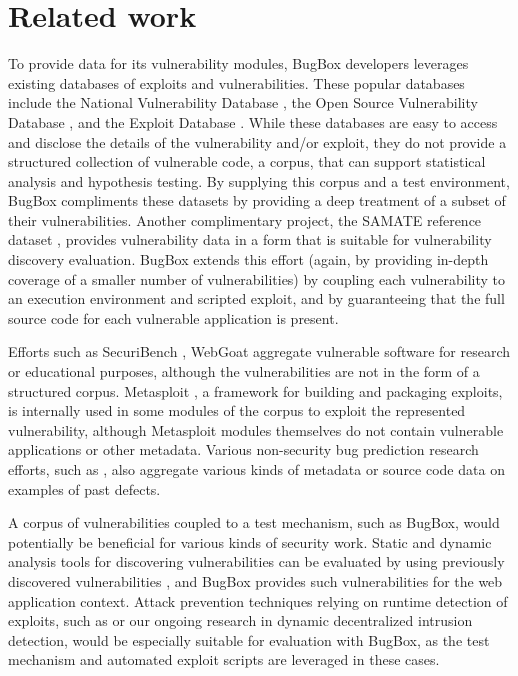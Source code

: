 \documentclass[letterpaper,twocolumn,10pt]{article}
\begin{document}
\section{Related work}
To provide data for its vulnerability modules, BugBox developers leverages existing databases of exploits and vulnerabilities. These popular databases include the National Vulnerability Database \cite{NVD}, the Open Source Vulnerability Database \cite{OSVDB}, and the Exploit Database \cite{exploitdb}. While these databases are easy to access and disclose the details of the vulnerability and/or exploit, they do not provide a structured collection of vulnerable code, a corpus, that can support statistical analysis and hypothesis testing. By supplying this corpus and a test environment, BugBox compliments these datasets by providing a deep treatment of a subset of their vulnerabilities. Another complimentary project, the SAMATE reference dataset \cite{SAMATE}, provides vulnerability data in a form that is suitable for vulnerability discovery evaluation. BugBox extends this effort (again, by providing in-depth coverage of a smaller number of vulnerabilities) by coupling each vulnerability to an execution environment and scripted exploit, and by guaranteeing that the full source code for each vulnerable application is present.

Efforts such as SecuriBench \cite{livshits2005defining}, WebGoat \cite{webgoat} aggregate vulnerable software for research or educational purposes, although the vulnerabilities are not in the form of a structured corpus. Metasploit \cite{metasploit}, a framework for building and packaging exploits, is internally used in some modules of the corpus to exploit the represented vulnerability, although Metasploit modules themselves do not contain vulnerable applications or other metadata. Various non-security bug prediction research efforts, such as \cite{defectcorpus,eclipsebugdata}, also aggregate various kinds of metadata or source code data on examples of past defects.

A corpus of vulnerabilities coupled to a test mechanism, such as BugBox, would potentially be beneficial for various kinds of security work. Static and dynamic analysis tools for discovering vulnerabilities \cite{onetechnique,antunes2009comparing} can be evaluated by using previously discovered vulnerabilities \cite{bufferoverflowbenchmark}, and BugBox provides such vulnerabilities for the web application context. Attack prevention techniques relying on runtime detection of exploits, such as \cite{commandinjection} or our ongoing research in dynamic decentralized intrusion detection, would be especially suitable for evaluation with BugBox, as the test mechanism and automated exploit scripts are leveraged in these cases.
\end{document}
